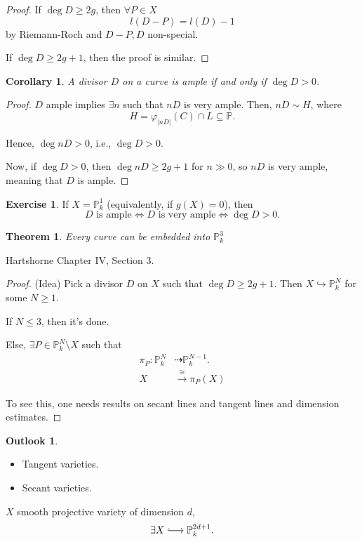\documentclass[12pt]{article}
\newtheorem*{theorem}{Theorem}
\newtheorem*{corollary}{Corollary}
\theoremstyle{definition}
\newtheorem*{exercise}{Exercise}
\newtheorem*{outlook}{Outlook}
\begin{document}
\begin{proof}
If $\deg D\geq2g$, then $\forall P\in X$
\[l(D-P)=l(D)-1\]
by Riemann-Roch and $D-P,D$ non-special.

If $\deg D\geq2g+1$, then the proof is similar.
\end{proof}

\begin{corollary}
A divisor $D$ on a curve is ample if and only if $\deg D>0$.
\end{corollary}

\begin{proof}
$D$ ample implies $\exists n$ such that $nD$ is very ample. Then, $nD\sim H$, where
\[H=\varphi_{|nD|}(C)\cap L\subseteq\mathbb P.\]

Hence, $\deg nD>0$, i.e., $\deg D>0$.

Now, if $\deg D>0$, then $\deg nD\geq2g+1$ for $n\gg0$, so $nD$ is very ample, meaning that $D$ is ample.
\end{proof}

\begin{exercise}
If $X=\mathbb P_k^1$ (equivalently, if $g(X)=0$), then
\[D\text{ is ample}\Longleftrightarrow D\text{ is very ample}\Longleftrightarrow\deg D>0.\]
\end{exercise}

\begin{theorem}
Every curve can be embedded into $\mathbb P_k^3$
\end{theorem}

Hartshorne \cite{hartshorne2013algebraic} Chapter IV, Section 3.

\begin{proof}
(Idea) Pick a divisor $D$ on $X$ such that $\deg D\geq2g+1$. Then $X\hookrightarrow\mathbb P_k^N$ for some $N\geq1$.

If $N\leq3$, then it's done.

Else, $\exists P\in\mathbb P_k^N\setminus X$ such that
\begin{align*}\tag{Projection away from $P$}
\pi_P:\mathbb P_k^N&\dashrightarrow\mathbb P_k^{N-1}.\\X&\overset\cong\longrightarrow\pi_P(X)
\end{align*}

To see this, one needs results on secant lines and tangent lines and dimension estimates.
\end{proof}

\begin{outlook}
\begin{itemize}[label=$-$]
\item Tangent varieties.
\item Secant varieties.
\end{itemize}

$X$ smooth projective variety of dimension $d$,
\[\exists X\lhook\joinrel\longrightarrow\mathbb P_k^{2d+1}.\]
\end{outlook}
\end{document}
